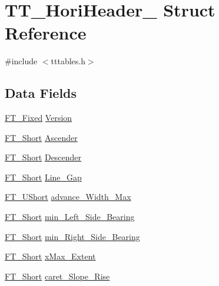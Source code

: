 \hypertarget{struct_t_t___hori_header__}{}\section{T\+T\+\_\+\+Hori\+Header\+\_\+ Struct Reference}
\label{struct_t_t___hori_header__}


{\ttfamily \#include $<$tttables.\+h$>$}

\subsection*{Data Fields}
\begin{DoxyCompactItemize}
\item 
\hyperlink{fttypes_8h_a5f5a679cc09f758efdd0d1c5feed3c3d}{F\+T\+\_\+\+Fixed} \hyperlink{struct_t_t___hori_header___a2d0967448b63db392e35b566196fef97}{Version}
\item 
\hyperlink{fttypes_8h_aa7279be89046a2563cd3d4d6651fbdcf}{F\+T\+\_\+\+Short} \hyperlink{struct_t_t___hori_header___a6f987c89428c93854dab06e506134249}{Ascender}
\item 
\hyperlink{fttypes_8h_aa7279be89046a2563cd3d4d6651fbdcf}{F\+T\+\_\+\+Short} \hyperlink{struct_t_t___hori_header___ad5be55a98dfaa079a2aaa462034a1512}{Descender}
\item 
\hyperlink{fttypes_8h_aa7279be89046a2563cd3d4d6651fbdcf}{F\+T\+\_\+\+Short} \hyperlink{struct_t_t___hori_header___a4165055ed05e42a2e5eed805bfe3fd7d}{Line\+\_\+\+Gap}
\item 
\hyperlink{fttypes_8h_a937f6c17cf5ffd09086d8610c37b9f58}{F\+T\+\_\+\+U\+Short} \hyperlink{struct_t_t___hori_header___a1ddad7e4c5e6fed50c073745961814da}{advance\+\_\+\+Width\+\_\+\+Max}
\item 
\hyperlink{fttypes_8h_aa7279be89046a2563cd3d4d6651fbdcf}{F\+T\+\_\+\+Short} \hyperlink{struct_t_t___hori_header___a0e2e2bf8ca0e18b610c4eae0a647fded}{min\+\_\+\+Left\+\_\+\+Side\+\_\+\+Bearing}
\item 
\hyperlink{fttypes_8h_aa7279be89046a2563cd3d4d6651fbdcf}{F\+T\+\_\+\+Short} \hyperlink{struct_t_t___hori_header___a64144cdd595e8e8de119b78539bf2fa7}{min\+\_\+\+Right\+\_\+\+Side\+\_\+\+Bearing}
\item 
\hyperlink{fttypes_8h_aa7279be89046a2563cd3d4d6651fbdcf}{F\+T\+\_\+\+Short} \hyperlink{struct_t_t___hori_header___ab483cb323f9adc9d959209a42eb19957}{x\+Max\+\_\+\+Extent}
\item 
\hyperlink{fttypes_8h_aa7279be89046a2563cd3d4d6651fbdcf}{F\+T\+\_\+\+Short} \hyperlink{struct_t_t___hori_header___aeb43d92f56de424d8f28bd389973eca4}{caret\+\_\+\+Slope\+\_\+\+Rise}

\end{DoxyCompactItemize}
